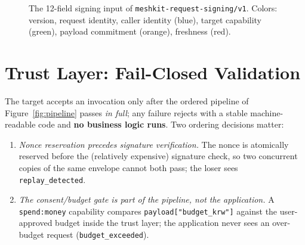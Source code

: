 \documentclass[10pt,twocolumn]{article}
\newcommand{\field}[1]{\texttt{#1}}
\begin{document}
\begin{figure}[t]
\centering
{}
\caption{The 12-field signing input of
\field{meshkit-request-signing/v1}. Colors: version, request identity,
caller identity (blue), target capability (green), payload commitment
(orange), freshness (red).}
\label{fig:signing}
\end{figure}

\section{Trust Layer: Fail-Closed Validation}
\label{sec:pipeline}

The target accepts an invocation only after the ordered pipeline of
Figure~\ref{fig:pipeline} passes \emph{in full}; any failure rejects with a
stable machine-readable code and \textbf{no business logic runs}. Two
ordering decisions matter:

\begin{enumerate}[leftmargin=1.4em,itemsep=1pt]
  \item \emph{Nonce reservation precedes signature verification.} The nonce
        is atomically reserved before the (relatively expensive) signature
        check, so two concurrent copies of the same envelope cannot both
        pass; the loser sees \field{replay\_detected}.
  \item \emph{The consent/budget gate is part of the pipeline, not the
        application.} A \field{spend:money} capability compares
        \field{payload["budget\_krw"]} against the user-approved budget
        inside the trust layer; the application never sees an over-budget
        request (\field{budget\_exceeded}).
\end{enumerate}
\end{document}
